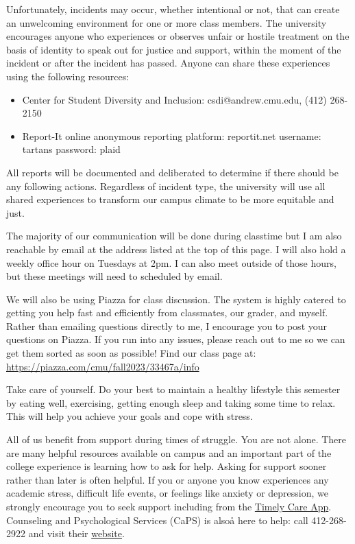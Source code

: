 \documentclass[11pt, a4paper]{article}
\begin{document}
Unfortunately, incidents may occur, whether intentional or not, that can create
an unwelcoming environment for one or more class members. The university
encourages anyone who experiences or observes unfair or hostile treatment on the
basis of identity to speak out for justice and support, within the moment of the
incident or after the incident has passed. Anyone can share these experiences
using the following resources:
\begin{itemize}
    \item Center for Student Diversity and Inclusion: csdi@andrew.cmu.edu, (412)
268-2150 
    \item Report-It online anonymous reporting platform: reportit.net username:
tartans password: plaid 
\end{itemize}
\noindent All reports will be documented and deliberated to determine if there
should be any following actions. Regardless of incident type, the university
will use all shared experiences to transform our campus climate to be more
equitable and just.

\vspace{.4cm}

\noindent The majority of our communication will be done during classtime but I
am also reachable by email at the address listed at the top of this page. I will
also hold a weekly office hour on Tuesdays at 2pm. I can also meet outside of
those hours, but these meetings will need to scheduled by email. 
\vspace{.4cm}

\noindent We will also be using Piazza for class discussion. The system is
highly catered to getting you help fast and efficiently from classmates, our
grader, and myself. Rather than emailing questions directly to me, I encourage
you to post your questions on Piazza. If you run into any issues, please reach out
to me so we can get them sorted as soon as possible!
\vspace{.4cm}
\noindent Find our class page at:
\href{https://piazza.com/cmu/fall2023/33467a/info}{https://piazza.com/cmu/fall2023/33467a/info}

\noindent Take care of yourself. Do your best to maintain a healthy lifestyle
this semester by eating well, exercising, getting enough sleep and taking some
time to relax. This will help you achieve your goals and cope with stress. 

All of us benefit from support during times of struggle. You are not alone.
There are many helpful resources available on campus and an important part of
the college experience is learning how to ask for help. Asking for support
sooner rather than later is often helpful. If you or anyone you know experiences
any academic stress, difficult life events, or feelings like anxiety or
depression, we strongly encourage you to seek support including from the
\href{https://www.cmu.edu/wellbeing/resources/timely-care.html}{Timely Care
App}. Counseling and Psychological Services (CaPS) is alsoå here to help: call
412-268-2922 and visit their \href{http://www.cmu.edu/counseling/}{website}.
\end{document}
